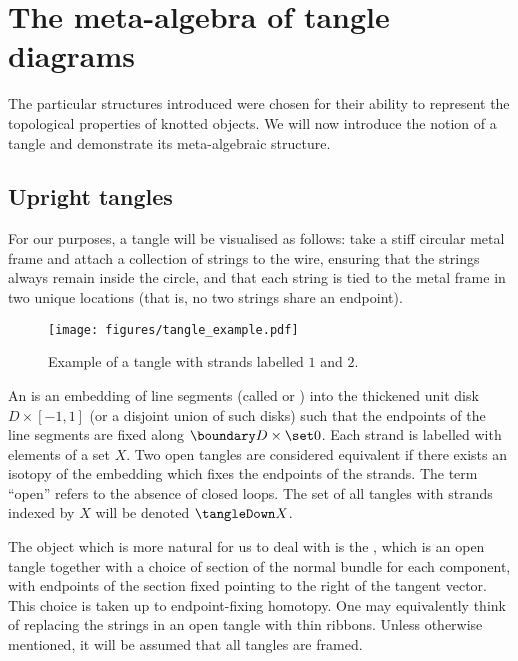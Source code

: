 \section{The meta-algebra of tangle diagrams}
\label{sec:topological_interpretations}

The particular structures introduced were chosen for their ability to represent
the topological properties of knotted objects. We will now introduce the notion
of a tangle and demonstrate its meta-algebraic structure.

\subsection{Upright tangles}

For our purposes, a tangle will be visualised as follows: take a stiff circular
metal frame and attach a collection of strings to the wire, ensuring that the
strings always remain inside the circle, and that each string is tied to the
metal frame in two unique locations (that is, no two strings share an endpoint).
\begin{figure}[h]
        \centering
        \texttt{[image: figures/tangle\_example.pdf]}
        \caption{Example of a tangle with strands labelled $1$ and $2$.}
        \label{fig:tangle_example}
\end{figure}

\begin{definition}
        An  is an embedding of line segments (called
         or ) into the thickened unit disk
        $D \times [-1,1]$ (or a disjoint union of such disks) such that the
        endpoints of the line segments are fixed along
        $\boundary D \times \set0$. Each strand is labelled with elements of a
        set $X$. Two open tangles are considered equivalent if there exists an
        isotopy of the embedding which fixes the endpoints of the strands. The
        term \enquote{open} refers to the absence of closed loops. The set of
        all tangles with strands indexed by $X$ will be denoted $\tangleDown X$.
\end{definition}

\begin{definition}
        The object which is more natural for us to deal with is the , which is an open tangle together with a choice of section of
        the normal bundle for each component, with endpoints of the section
        fixed pointing to the right of the tangent vector. This choice is taken
        up to endpoint-fixing homotopy. One may equivalently think of replacing
        the strings in an open tangle with thin ribbons. Unless otherwise
        mentioned, it will be assumed that all tangles are framed.
\end{definition}

